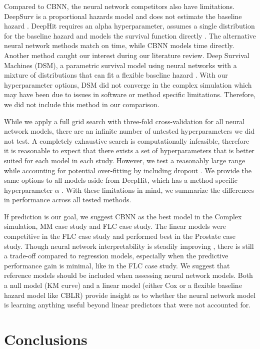 \documentclass[preprint,12pt]{elsarticle}
\begin{document}
Compared to CBNN, the neural network competitors also have limitations. DeepSurv is a proportional hazards model and does not estimate the baseline
hazard \citep{katzman2018DeepSurv}. DeepHit requires an alpha hyperparameter, assumes a single distribution for the baseline hazard and models the
survival function directly \citep{lee2018DeepHit}. The alternative neural network methods match on time, while CBNN models time directly. Another method
caught our interest during our literature review. Deep Survival Machines (DSM), a parametric survival model using neural networks with a mixture of
distributions that can fit a flexible baseline hazard \citep{dsmPaper}. With our hyperparameter options, DSM did not converge in the complex
simulation which may have been due to issues in software or method specific limitations. Therefore, we did not include this method in our comparison.

While we apply a full grid search with three-fold cross-validation for all neural network models, there are an infinite number of untested hyperparameters we did not test. A completely
exhaustive search is computationally infeasible, therefore it is reasonable to expect that there exists a set of hyperparameters that is better suited for each model
in each study. However, we test a reasonably large range while accounting for potential over-fitting by including dropout \citep{gulli2017}. We provide the same
options to all models aside from DeepHit, which has a method specific hyperparameter $\alpha$ \citep{lee2018DeepHit}. With these limitations in mind, we
summarize the differences in performance across all tested methods.

If prediction is our goal, we suggest CBNN as the best model in the Complex simulation, MM case study and FLC case study. The linear models were
competitive in the FLC case study and performed best in the Prostate case study. Though neural network interpretability is steadily improving \citep{interpret},
there is still a trade-off compared to regression models, especially when the predictive performance gain is minimal, like in the FLC case study. We suggest
that reference models should be included when assessing neural network models. Both a null model (KM curve) and a linear model (either Cox or a flexible
baseline hazard model like CBLR) provide insight as to whether the neural network model is learning anything useful beyond linear predictors that were
not accounted for.

\section{Conclusions}\label{sec5}
\end{document}
